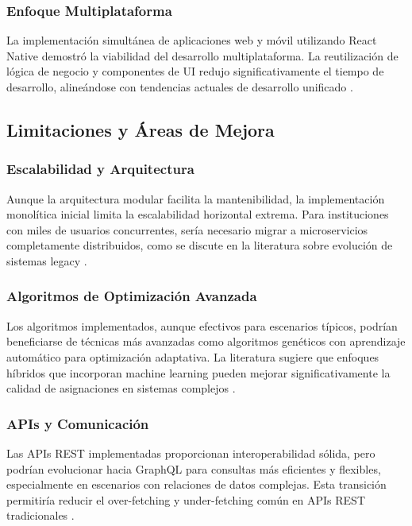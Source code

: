 \subsubsection{Enfoque Multiplataforma}

La implementación simultánea de aplicaciones web y móvil utilizando React Native demostró la viabilidad del desarrollo multiplataforma. La reutilización de lógica de negocio y componentes de UI redujo significativamente el tiempo de desarrollo, alineándose con tendencias actuales de desarrollo unificado \cite{macias2021}.

\subsection{Limitaciones y Áreas de Mejora}

\subsubsection{Escalabilidad y Arquitectura}

Aunque la arquitectura modular facilita la mantenibilidad, la implementación monolítica inicial limita la escalabilidad horizontal extrema. Para instituciones con miles de usuarios concurrentes, sería necesario migrar a microservicios completamente distribuidos, como se discute en la literatura sobre evolución de sistemas legacy \cite{torres2020}.

\subsubsection{Algoritmos de Optimización Avanzada}

Los algoritmos implementados, aunque efectivos para escenarios típicos, podrían beneficiarse de técnicas más avanzadas como algoritmos genéticos con aprendizaje automático para optimización adaptativa. La literatura sugiere que enfoques híbridos que incorporan machine learning pueden mejorar significativamente la calidad de asignaciones en sistemas complejos \cite{desarrollo2025}.

\subsubsection{APIs y Comunicación}

Las APIs REST implementadas proporcionan interoperabilidad sólida, pero podrían evolucionar hacia GraphQL para consultas más eficientes y flexibles, especialmente en escenarios con relaciones de datos complejas. Esta transición permitiría reducir el over-fetching y under-fetching común en APIs REST tradicionales \cite{amodeo2013}.


